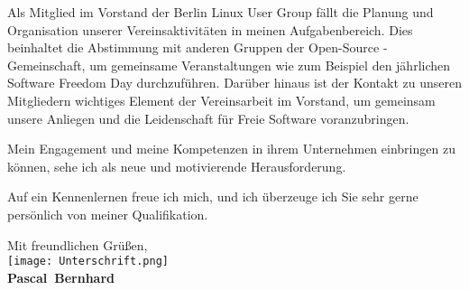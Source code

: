 \documentclass[11pt,a4paper]{article}
\def\firstname{Pascal}
\def\familyname{Bernhard}
\begin{document}
Als Mitglied im Vorstand der Berlin Linux User Group fällt die Planung und Organisation unserer Vereinsaktivitäten in meinen Aufgabenbereich. Dies beinhaltet die Abstimmung mit anderen Gruppen der Open-Source - Gemeinschaft, um gemeinsame Veranstaltungen wie zum Beispiel den jährlichen Software Freedom Day durchzuführen. Darüber hinaus ist der Kontakt zu unseren Mitgliedern wichtiges Element der Vereinsarbeit im Vorstand, um gemeinsam unsere Anliegen und die Leidenschaft für Freie Software voranzubringen.

Mein Engagement und meine Kompetenzen in ihrem Unternehmen einbringen zu können, sehe ich als neue und motivierende Herausforderung.

Auf ein Kennenlernen freue ich mich, und ich überzeuge ich Sie sehr gerne persönlich von meiner Qualifikation.

Mit freundlichen Grüßen,\\[3em] %
%
\texttt{[image: Unterschrift.png]}\\
{\bfseries \firstname~\familyname}\\
%
\end{document}
